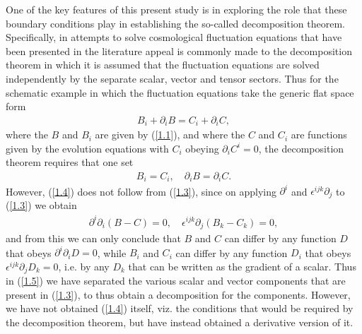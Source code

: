 \documentclass[aps,onecolumn,10pt]{revtex4}
\numberwithin{equation}{section}
\numberwithin{equation}{section}
\begin{document}
One of the key features of this present study is in exploring the role that these boundary conditions play in establishing the so-called decomposition theorem. Specifically, in attempts to solve cosmological  fluctuation equations that have been presented in the literature appeal is commonly made to the decomposition theorem in which it is assumed that the fluctuation equations are solved independently by the separate scalar, vector and tensor sectors. Thus for the schematic example in which the fluctuation equations  take the generic flat space form
%
\begin{eqnarray}
B_i+\partial_iB=C_i+\partial_iC,
\label{1.3}
\end{eqnarray}
%
where the $B$ and $B_i$ are given by (\ref{1.1}), and where the $C$ and $C_i$ are functions given by the evolution equations with $C_i$ obeying  $\partial_iC^i=0$, the decomposition theorem requires that one set
%
\begin{eqnarray}
B_i= C_i,\quad \partial_iB=\partial_iC.
\label{1.4}
\end{eqnarray}
%
However, (\ref{1.4}) does not follow from (\ref{1.3}), since on applying $\partial^i$ and $\epsilon^{ijk}\partial_j$  to (\ref{1.3}) we obtain 
%
\begin{eqnarray}
\partial^i\partial_i(B-C)=0,\quad \epsilon^{ijk}\partial_j(B_k-C_k)=0,
\label{1.5}
\end{eqnarray}
%
and from this we can only conclude that $B$ and $C$ can differ by any function $D$ that obeys $\partial^i\partial_iD=0$, while $B_i$ and $C_i$ can differ by any function $D_i$ that obeys $\epsilon^{ijk}\partial_jD_k=0$, i.e. by any $D_k$ that can be written as the gradient of a scalar. Thus in (\ref{1.5}) we have separated the various scalar and vector components that are present in (\ref{1.3}), to thus obtain a decomposition for the components. However, we have not obtained (\ref{1.4}) itself, viz. the conditions that would be required by the decomposition theorem, but have instead obtained a derivative version of it. 
\end{document}
